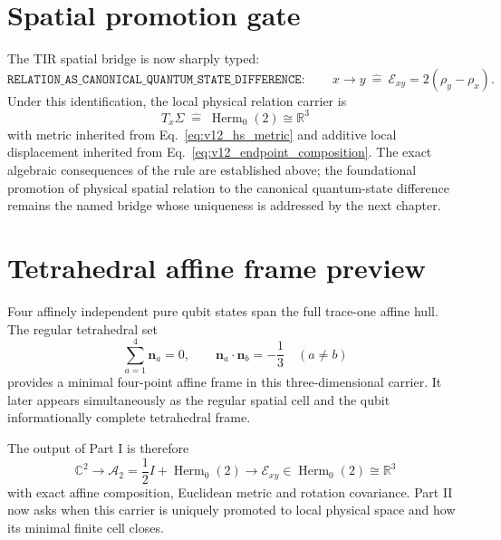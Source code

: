 \section{Spatial promotion gate}

The TIR spatial bridge is now sharply typed:
\begin{equation}
\boxed{
\texttt{RELATION\_AS\_CANONICAL\_QUANTUM\_STATE\_DIFFERENCE}:
\qquad
x\to y
\ \widehat{=}\ 
\mathcal E_{xy}=2(\rho_y-\rho_x).
}
\label{eq:v12_relation_promotion_rule}
\end{equation}
Under this identification, the local physical relation carrier is
\begin{equation}
\boxed{
T_x\Sigma\;\widehat{=}\;\operatorname{Herm}_0(2)\cong\mathbb R^3
}
\label{eq:v12_spatial_promotion}
\end{equation}
with metric inherited from Eq.~\eqref{eq:v12_hs_metric} and additive local displacement inherited from Eq.~\eqref{eq:v12_endpoint_composition}.
\vTwelveStatus{B}{--}{OPEN}
The exact algebraic consequences of the rule are established above; the foundational promotion of physical spatial relation to the canonical quantum-state difference remains the named bridge whose uniqueness is addressed by the next chapter.

\section{Tetrahedral affine frame preview}

Four affinely independent pure qubit states span the full trace-one affine hull. The regular tetrahedral set
\begin{equation}
\sum_{a=1}^4\mathbf n_a=0,
\qquad
\mathbf n_a\cdot\mathbf n_b=-\frac13\quad(a\neq b)
\end{equation}
provides a minimal four-point affine frame in this three-dimensional carrier. It later appears simultaneously as the regular spatial cell and the qubit informationally complete tetrahedral frame.

The output of Part I is therefore
\begin{equation}
\boxed{
\mathbb C^2
\to
\mathcal A_2=\frac12I+\operatorname{Herm}_0(2)
\to
\mathcal E_{xy}\in\operatorname{Herm}_0(2)\cong\mathbb R^3
}
\end{equation}
with exact affine composition, Euclidean metric and rotation covariance. Part II now asks when this carrier is uniquely promoted to local physical space and how its minimal finite cell closes.
